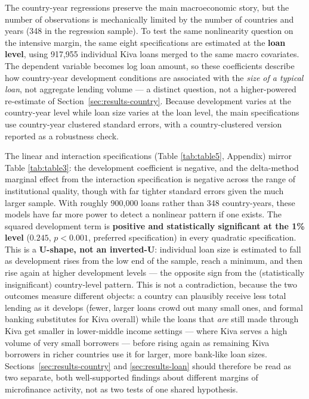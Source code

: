 \documentclass[12pt]{article}
\begin{document}
The country-year regressions preserve the main macroeconomic story, but the number of observations is
mechanically limited by the number of countries and years (348 in the regression sample). To test the
same nonlinearity question on the intensive margin, the same eight specifications are estimated at the
\textbf{loan level}, using 917,955 individual Kiva loans merged to the same macro covariates. The
dependent variable becomes log loan amount, so these coefficients describe how country-year
development conditions are associated with the \emph{size of a typical loan}, not aggregate lending
volume --- a distinct question, not a higher-powered re-estimate of Section~\ref{sec:results-country}.
Because development varies at the country-year level while loan size varies at the loan level, the
main specifications use country-year clustered standard errors, with a country-clustered version
reported as a robustness check.

The linear and interaction specifications (Table \ref{tab:table5}, Appendix) mirror
Table \ref{tab:table3}: the development coefficient is negative, and the delta-method marginal effect
from the interaction specification is negative across the range of institutional quality, though with
far tighter standard errors given the much larger sample. With roughly 900,000 loans rather than 348
country-years, these models have far more power to detect a nonlinear pattern if one exists. The
squared development term is \textbf{positive and statistically
significant at the 1\% level} ($0.245$, $p<0.001$, preferred specification) in every quadratic
specification. This is a \textbf{U-shape, not an inverted-U}: individual loan size is estimated to
fall as development rises from the low end of the sample, reach a minimum, and then rise again at
higher development levels --- the opposite sign from the (statistically insignificant) country-level
pattern. This is not a contradiction, because the two outcomes measure different objects: a country
can plausibly receive less total lending as it develops (fewer, larger loans crowd out many small
ones, and formal banking substitutes for Kiva overall) while the loans that \emph{are} still made
through Kiva get smaller in lower-middle income settings --- where Kiva serves a high volume of very
small borrowers --- before rising again as remaining Kiva borrowers in richer countries use it for
larger, more bank-like loan sizes. Sections~\ref{sec:results-country} and \ref{sec:results-loan}
should therefore be read as two separate, both well-supported findings about different margins of
microfinance activity, not as two tests of one shared hypothesis.
\end{document}

